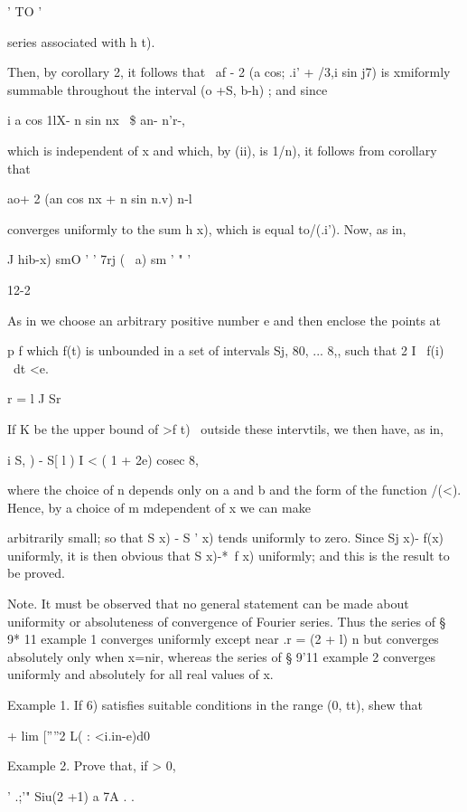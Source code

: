   ' TO '

series associated with h t).

Then, by corollary 2, it follows that \ af - 2 (a cos; .i' +
/3,i sin j7) is xmiformly summable throughout the interval (o +S, b-h)
; and since

i a cos 1lX- n sin nx \ \$ an- n'r-,

which is independent of x and which, by (ii), is 1/n), it
follows from corollary that

 ao+ 2 (an cos nx + n sin n.v) n-l

converges uniformly to the sum h x), which is equal to/(.i'). Now, as
in,

   J hib-x) smO ' ' 7rj ( \ a) sm ' " '

12-2

%
%

As in we choose an arbitrary positive number e and then enclose
the points at

p f which f(t) is unbounded in a set of intervals Sj, 80, ... 8,, such
that 2 I \ f(i) \ dt <e.

r = l J Sr

If K be the upper bound of >f t) \ outside these intervtils, we then
have, as in,

i S, ) - S[ l ) I < ( 1 + 2e) cosec 8,

where the choice of n depends only on a and b and the form of the
function /(<). Hence, by a choice of m mdependent of x we can make

arbitrarily small; so that S x) - S ' x) tends uniformly to zero.
Since Sj x)- f(x) uniformly, it is then obvious that S x)-*~f x)
uniformly; and this is the result to be proved.

Note. It must be observed that no general statement can be made about
uniformity or absoluteness of convergence of Fourier series. Thus the
series of § 9* 11 example 1 converges uniformly except near .r = (2 +
l) n but converges absolutely only when x=nir, whereas the series of §
9'11 example 2 converges uniformly and absolutely for all real values
of x.

Example 1. If 6) satisfies suitable conditions in the range (0, tt),
shew that

+ lim [''''2 L( : <i.in-e)d0

Example 2. Prove that, if > 0,

' .;'" Siu(2 +1) a 7A . .

